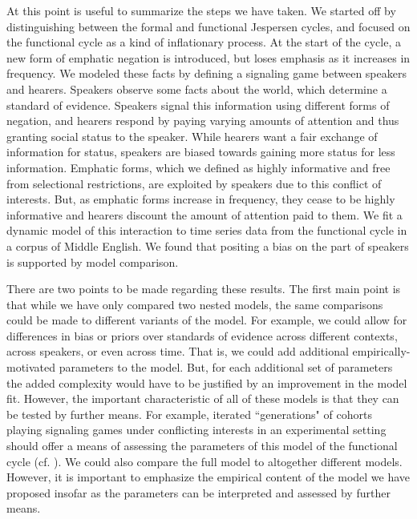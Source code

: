 \documentclass[linguex]{sp}
\theoremstyle{definition} \newtheorem{definition}{Definition}
\begin{document}
At this point is useful to summarize the steps we have taken. We started off by distinguishing between the formal and functional Jespersen cycles, and focused on the functional cycle as a kind of inflationary process. At the start of the cycle, a new form of emphatic negation is introduced, but loses emphasis as it increases in frequency. We modeled these facts by defining a signaling game between speakers and hearers. Speakers observe some facts about the world, which determine a standard of evidence. Speakers signal this information using different forms of negation, and hearers respond by paying varying amounts of attention and thus granting social status to the speaker. While hearers want a fair exchange of information for status, speakers are biased towards gaining more status for less information. Emphatic forms, which we defined as highly informative and free from selectional restrictions, are exploited by speakers due to this conflict of interests. But, as emphatic forms increase in frequency, they cease to be highly informative and hearers discount the amount of attention paid to them. We fit a dynamic model of this interaction to time series data from the functional cycle in a corpus of Middle English. We found that positing a bias on the part of speakers is supported by model comparison.

There are two points to be made regarding these results. The first main point is that while we have only compared two nested models, the same comparisons could be made to different variants of the model. For example, we could allow for differences in bias or priors over standards of evidence across different contexts, across speakers, or even across time. That is, we could add additional empirically-motivated parameters to the model. But, for each additional set of parameters the added complexity would have to be justified by an improvement in the model fit. However, the important characteristic of all of these models is that they can be tested by further means. For example, iterated ``generations" of cohorts playing signaling games under conflicting interests in an experimental setting should offer a means of assessing the parameters of this model of the functional cycle  (cf. \citealt{blume-etal:2001,mesoudi2008multiple}).  We could also compare the full model to altogether different models. However, it is important to emphasize the empirical content of the model we have proposed insofar as the parameters can be interpreted and assessed by further means. 
\end{document}

